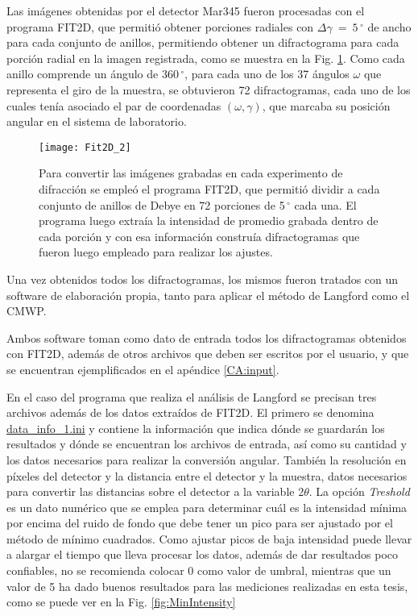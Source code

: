 Las imágenes obtenidas por el detector Mar345 fueron procesadas con el programa FIT2D\cite{FIT2D}, que permitió obtener porciones radiales con $\Delta \gamma \ = \ 5\,^{\circ}$ de ancho para cada conjunto de anillos, permitiendo obtener un difractograma para cada porción radial en la imagen registrada, como se muestra en la Fig. \ref{fig:fit2d}.
Como cada anillo comprende un ángulo de 360\,$^{\circ}$, para cada uno de los 37 ángulos $\omega$ que representa el giro de la muestra, se obtuvieron 72 difractogramas, cada uno de los cuales tenía asociado el par de coordenadas $(\omega, \gamma)$, que marcaba su posición angular en el sistema de laboratorio.

\begin{figure}[!htb] 
  \centering
  \texttt{[image: Fit2D\_2]}
  \caption{Para convertir las imágenes grabadas en cada experimento de difracción se empleó el programa FIT2D, que permitió dividir a cada conjunto de anillos de Debye en 72 porciones de 5\,$^{\circ}$ cada una. El programa luego extraía la intensidad de promedio grabada dentro de cada porción y con esa información construía difractogramas que fueron luego empleado para realizar los ajustes.}
  \label{fig:fit2d}
\end{figure}

Una vez obtenidos todos los difractogramas, los mismos fueron tratados con un software de elaboración propia, tanto para aplicar el método de Langford como el CMWP.

Ambos software toman como dato de entrada todos los difractogramas obtenidos con FIT2D, además de otros archivos que deben ser escritos por el usuario, y que se encuentran ejemplificados en el apéndice \ref{CA:input}.

En el caso del programa que realiza el análisis de Langford se precisan tres archivos además de los datos extraídos de FIT2D.
El primero se denomina \hyperlink{datainfo}{data\_info\_1.ini} y contiene la información que indica dónde se guardarán los resultados y dónde se encuentran los archivos de entrada, así como su cantidad y los datos necesarios para realizar la conversión angular.
También la resolución en píxeles del detector y la distancia entre el detector y la muestra, datos necesarios para convertir las distancias sobre el detector a la variable 2$\theta$.
La opción \textit{Treshold} es un dato numérico que se emplea para determinar cuál es la intensidad mínima por encima del ruido de fondo que debe tener un pico para ser ajustado por el método de mínimo cuadrados. 
Como ajustar picos de baja intensidad puede llevar a alargar el tiempo que lleva procesar los datos, además de dar resultados poco confiables, no se recomienda colocar 0 como valor de umbral, mientras que un valor de 5 ha dado buenos resultados para las mediciones realizadas en esta tesis, como se puede ver en la Fig. \ref{fig:MinIntensity}


